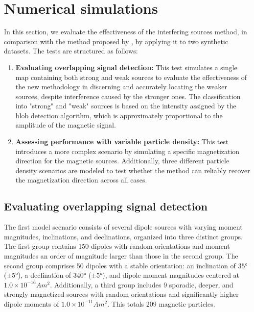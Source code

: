 \section{Numerical simulations}

In this section, we evaluate the effectiveness of the interfering sources method, in comparison with the method proposed by \citet{Souza-Junior2024}, by applying it to two synthetic datasets. The tests are structured as follows:  

\begin{enumerate}
    \item \textbf{Evaluating overlapping signal detection:} This test simulates a single map containing both strong and weak sources to evaluate the effectiveness of the new methodology in discerning and accurately locating the weaker sources, despite interference caused by the stronger ones. The classification into "strong" and "weak" sources is based on the intensity assigned by the blob detection algorithm, which is approximately proportional to the amplitude of the magnetic signal.

        
    \item \textbf{Assessing performance with variable particle density:} This test introduces a more complex scenario by simulating a specific magnetization direction for the magnetic sources. Additionally, three different particle density scenarios are modeled to test whether the method can reliably recover the magnetization direction across all cases.
        
\end{enumerate}

\subsection{Evaluating overlapping signal detection}
\label{sec:synthetic-overlapping}

The first model scenario consists of several dipole sources with varying moment magnitudes, inclinations, and declinations, organized into three distinct groups. The first group contains 150 dipoles with random orientations and moment magnitudes an order of magnitude larger than those in the second group. The second group comprises 50 dipoles with a stable orientation: an inclination of \(\ang{35}\) (\(\pm \ang{5}\)), a declination of \(\ang{340}\) (\(\pm \ang{5}\)), and dipole moment magnitudes centered at \(1.0 \times 10^{-16} Am^2\). Additionally, a third group includes 9 sporadic, deeper, and strongly magnetized sources with random orientations and significantly higher dipole moments of \(1.0 \times 10^{-11} Am^2\). This totals 209 magnetic particles.


